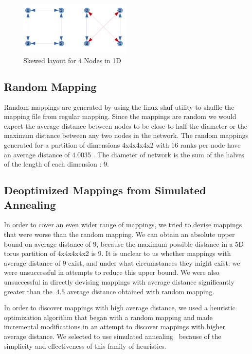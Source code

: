 \documentclass{acm_proc_article-sp}
\begin{document}
\label{sect:Skewed mapping in 1D}
\begin{figure}
  \center
  \includegraphics[width=0.5\textwidth]{skewed_layout_cropped.pdf}
  \caption{Skewed layout for 4 Nodes in 1D}
    \label{fig:Skewed layout for 4 Nodes in 1D}
\end{figure}

\subsection{Random Mapping}
\label{sect:random}

Random mappings are generated by using the linux shuf utility to shuffle the mapping file from regular mapping.
Since the mappings are random we would expect the average distance between nodes to be close to half the diameter
or the maximum distance between any two nodes in the network. The random mappings generated for a partition of
dimensions 4x4x4x4x2 with 16 ranks per node have an average distance of 4.0035 .
The diameter of network is the sum of the halves of the length of each dimension : 9.


\subsection{Deoptimized Mappings from Simulated Annealing}
In order to cover an even wider range of mappings, we tried to
devise mappings that were worse than the random mapping.
We can obtain an absolute upper bound on average distance of
$9$, because the maximum possible distance in a 5D torus
partition of 4x4x4x4x2 is 9.  It is unclear to us whether
mappings with average distance of $9$ exist, and under what
circumstances they might exist: we were unsuccessful in
attempts to reduce this upper bound.  We were also
unsuccessful in directly devising mappings
with average distance significantly greater than the $~4.5$ average
distance obtained with random mapping.

In order to discover mappings with high average distance, we used
a heuristic optimization algorithm that began with a random mapping
and made incremental modifications in an attempt to discover mappings
with higher average distance.
We selected to use simulated annealing~\cite{Press2007} because of the
simplicity and effectiveness of this family of heuristics.
\end{document}

